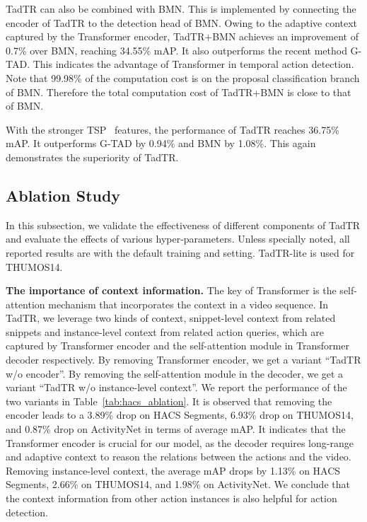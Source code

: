 \documentclass[lettersize,journal]{IEEEtran}
\begin{document}
TadTR can also be combined with BMN. This is implemented by connecting the encoder of TadTR to the detection head of BMN. Owing to the adaptive context captured by the Transformer encoder, TadTR+BMN achieves an improvement of 0.7\% over BMN, reaching 34.55\% mAP.  It also outperforms the recent method G-TAD. This indicates the advantage of Transformer in temporal action detection.
Note that 99.98\% of the computation cost is on the proposal classification branch of BMN. Therefore the total computation cost of TadTR+BMN is close to that of BMN.

With the stronger TSP~\cite{alwassel_2021_tsp} features, the performance of TadTR reaches 36.75\% mAP. It outperforms G-TAD by 0.94\% and BMN by 1.08\%. This again demonstrates the superiority of TadTR.


\subsection{Ablation Study}
In this subsection, we validate the effectiveness of different components of TadTR and evaluate the effects of various hyper-parameters. Unless specially noted, all reported results are with the default training and setting. TadTR-lite is used for THUMOS14.

\vspace{1ex}\noindent\textbf{The importance of context information.} The key of Transformer is the self-attention mechanism that incorporates the context in a video sequence. In TadTR, we leverage two kinds of context, snippet-level context from related snippets and instance-level context from related action queries, which are captured by Transformer encoder and the self-attention module in Transformer decoder respectively. 
By removing Transformer encoder, we get a variant ``TadTR w/o encoder''.  By removing the self-attention module in the decoder, we get a variant ``TadTR w/o instance-level context''.
We report the performance of the two variants in Table~\ref{tab:hacs_ablation}. It is observed that removing the encoder leads to a 3.89\% drop on HACS Segments, 6.93\% drop on THUMOS14, and 0.87\% drop on ActivityNet in terms of average mAP. It indicates that the Transformer encoder is crucial for our model, as the decoder requires long-range and adaptive context to reason the relations between the actions and the video. 
Removing instance-level context, the average mAP drops by 1.13\% on HACS Segments, 2.66\% on THUMOS14, and 1.98\% on ActivityNet. We conclude that the context information from other action instances is also helpful for action detection.
\end{document}
